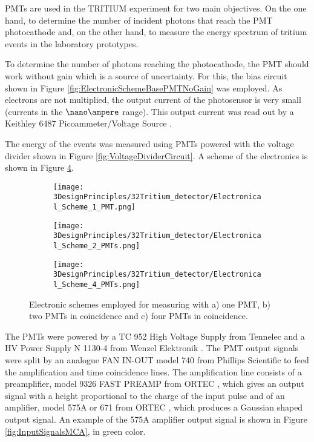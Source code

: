 PMTs are used in the TRITIUM experiment for two main objectives. On the one hand, to determine the number of incident photons that reach the PMT photocathode and, on the other hand, to measure the energy spectrum of tritium events in the laboratory prototypes.

To determine the number of photons reaching the photocathode, the PMT should work without gain which is a source of uncertainty. For this, the bias circuit shown in Figure \ref{fig:ElectronicSchemeBasePMTNoGain} was employed. As electrons are not multiplied, the output current of the photosensor is very small (currents in the $\nano\ampere$ range). This output current was read out by a Keithley 6487 Picoammeter/Voltage Source \cite{DataSheetKeithley6487}. 

The energy of the events was measured using PMTs powered with the voltage divider shown in Figure \ref{fig:VoltageDividerCircuit}. A scheme of the electronics is shown in Figure \ref{fig:ElectronicConfiguraitonsPMT}.
\begin{figure}
\centering
    \begin{subfigure}[b]{1.0\textwidth}
    \centering
    \texttt{[image: 3DesignPrinciples/32Tritium\_detector/Electronical\_Scheme\_1\_PMT.png]}  
    \caption{\label{subfig:ElectronicConfiguraiton1PMT}}
    \end{subfigure}
    \hfill
    \begin{subfigure}[b]{1.0\textwidth}
    \centering
    \texttt{[image: 3DesignPrinciples/32Tritium\_detector/Electronical\_Scheme\_2\_PMTs.png]}  
    \caption{\label{subfig:ElectronicConfiguraiton2PMT}}
    \end{subfigure}
    \hfill
    \begin{subfigure}[b]{1.0\textwidth}
    \centering
    \texttt{[image: 3DesignPrinciples/32Tritium\_detector/Electronical\_Scheme\_4\_PMTs.png]}  
    \caption{\label{subfig:ElectronicConfiguraiton4PMT}}
    \end{subfigure}
 \caption{Electronic schemes employed for measuring with a) one PMT, b) two PMTs in coincidence and c) four PMTs in coincidence.}
 \label{fig:ElectronicConfiguraitonsPMT}
\end{figure}
The PMTs were powered by a TC 952 High Voltage Supply from Tennelec \cite{DataSheetHVSupplyTennelec} and a HV Power Supply N 1130-4 from Wenzel Elektronik \cite{DataSheetHVSupplyWenzel}. The PMT output signals were split by an analogue FAN IN-OUT model 740 from Phillips Scientific \cite{DataSheetFANINOUT} to feed the amplification and time coincidence lines. The amplification line consists of a preamplifier, model 9326 FAST PREAMP from ORTEC \cite{DataSheetPreAmp}, which gives an output signal with a height proportional to the charge of the input pulse and of an amplifier, model 575A or 671 from ORTEC \cite{DataSheet575Amp, DataSheet671Amp}, which produces a Gaussian shaped output signal. An example of the 575A amplifier output signal is shown in Figure \ref{fig:InputSignalsMCA}, in green color. 

